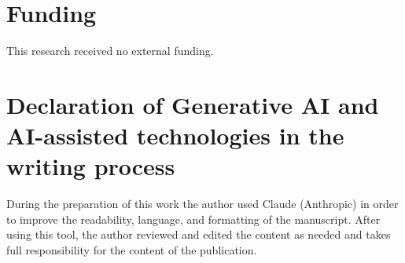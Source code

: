 \section*{Funding}

This research received no external funding.

\section*{Declaration of Generative AI and AI-assisted technologies in the writing process}

During the preparation of this work the author used Claude (Anthropic) in order to improve the readability, language, and formatting of the manuscript. After using this tool, the author reviewed and edited the content as needed and takes full responsibility for the content of the publication.
